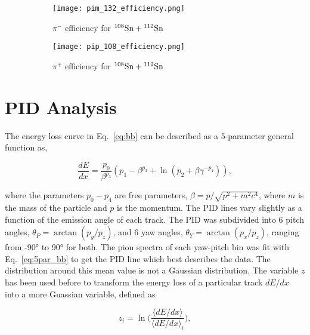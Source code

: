 \begin{figure}[!htb]
    \centering
    \begin{subfigure}[t]{0.49\textwidth}
        \centering
        \texttt{[image: pim\_132\_efficiency.png]}
        \caption{$\pi^-$ efficiency for ${}^{108}\mathrm{Sn} + {}^{112}\mathrm{Sn}$} \label{fig:pim_108_eff}
    \end{subfigure}
    \hfill
    \begin{subfigure}[t]{.49\textwidth}
        \centering
        \texttt{[image: pip\_108\_efficiency.png]} 
        \caption{$\pi^+$ efficiency for ${}^{108}\mathrm{Sn} + {}^{112}\mathrm{Sn}$} \label{fig:pip_108_eff}
    \end{subfigure}
  
    \caption{ }
\label{fig:108_eff}
\end{figure}


\section{PID Analysis}
\label{sec:pid}



The energy loss curve in Eq.~\ref{eq:bb} can be described as a 5-parameter general function as, 

\begin{equation}
\frac{dE}{dx} = \frac{p_0}{\beta^{p_3}}(p_1 - \beta^{p_3} + \ln(p_2 + {\beta\gamma}^{-p_4})),
\label{eq:5par_bb}
\end{equation}

where the parameters $p_0-p_4$ are free parameters, $\beta= p/\sqrt{p^2 + m^2c^4}$, where $m$ is the mass of the particle and $p$ is the momentum. The PID lines vary slightly as a function of the emission angle of each track. The PID was subdivided into 6 pitch angles, $\theta_P = \arctan(p_y/p_z)$, and 6 yaw angles, $\theta_Y = \arctan(p_x/p_z)$, ranging from \ang{-90} to \ang{90} for both. The pion spectra of each yaw-pitch bin was fit with Eq.~\ref{eq:5par_bb} to get the PID line which best describes the data. The distribution around this mean value is not a Gaussian distribution. The variable $z$ has been used before to transform the energy loss of a particular track $dE/dx$ into a more Guassian variable, defined as

\begin{equation}
z_i = \ln\Big(\frac{\langle dE/dx\rangle}{\langle dE/dx\rangle_i}\Big),
\end{equation}

